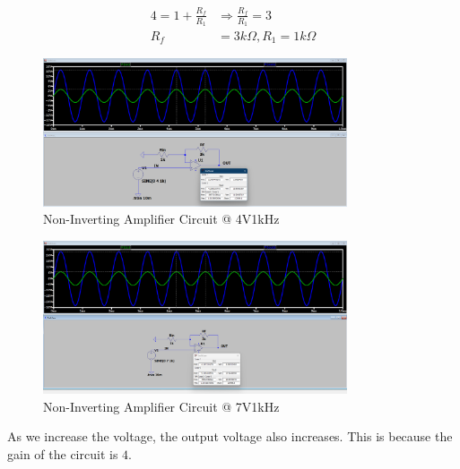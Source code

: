 \begin{align*}
    4 = 1 + \frac{R_{f}}{R_{1}} &\Rightarrow \frac{R_{f}}{R_{1}} = 3 \\
    R_{f} &= 3k\Omega, R_{1} = 1k\Omega
\end{align*}

\begin{figure}[h]
    \centering
    \includegraphics[width=0.8\textwidth]{assets/a4_design.png}
    \caption{Non-Inverting Amplifier Circuit @ 4V1kHz}
    \label{fig:non-inverting-amplifier-circuit-4v}
\end{figure}

\begin{figure}[h]
    \centering
    \includegraphics[width=0.8\textwidth]{assets/7_design.png}
    \caption{Non-Inverting Amplifier Circuit @ 7V1kHz}
    \label{fig:non-inverting-amplifier-circuit-7v}
\end{figure}

As we increase the voltage, the output voltage also increases. This is because the gain of the circuit is $4$.
